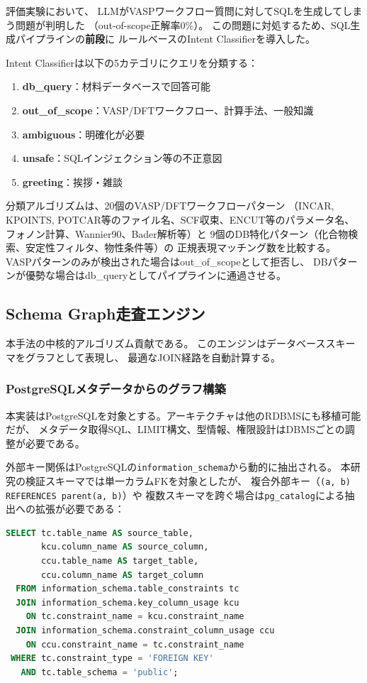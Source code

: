 \documentclass[5p,twocolumn]{elsarticle}
\begin{document}
評価実験において、
LLMがVASPワークフロー質問に対してSQLを生成してしまう問題が判明した
（out-of-scope正解率0\%）。
この問題に対処するため、SQL生成パイプラインの\textbf{前段}に
ルールベースのIntent Classifierを導入した。

Intent Classifierは以下の5カテゴリにクエリを分類する：

\begin{enumerate}
  \item \textbf{db\_query}：材料データベースで回答可能
  \item \textbf{out\_of\_scope}：VASP/DFTワークフロー、計算手法、一般知識
  \item \textbf{ambiguous}：明確化が必要
  \item \textbf{unsafe}：SQLインジェクション等の不正意図
  \item \textbf{greeting}：挨拶・雑談
\end{enumerate}

分類アルゴリズムは、20個のVASP/DFTワークフローパターン
（INCAR, KPOINTS, POTCAR等のファイル名、SCF収束、ENCUT等のパラメータ名、
フォノン計算、Wannier90、Bader解析等）と
9個のDB特化パターン（化合物検索、安定性フィルタ、物性条件等）の
正規表現マッチング数を比較する。
VASPパターンのみが検出された場合はout\_of\_scopeとして拒否し、
DBパターンが優勢な場合はdb\_queryとしてパイプラインに通過させる。

\subsection{Schema Graph走査エンジン}
\label{sec:schema_graph}

本手法の中核的アルゴリズム貢献である。
このエンジンはデータベーススキーマをグラフとして表現し、
最適なJOIN経路を自動計算する。

\subsubsection{PostgreSQLメタデータからのグラフ構築}

本実装はPostgreSQLを対象とする。アーキテクチャは他のRDBMSにも移植可能だが、
メタデータ取得SQL、LIMIT構文、型情報、権限設計はDBMSごとの調整が必要である。

外部キー関係はPostgreSQLの\texttt{information\_schema}から動的に抽出される。
本研究の検証スキーマでは単一カラムFKを対象としたが、
複合外部キー（\texttt{(a, b) REFERENCES parent(a, b)}）や
複数スキーマを跨ぐ場合は\texttt{pg\_catalog}による抽出への拡張が必要である：

\begin{lstlisting}[language=SQL,caption={FK関係抽出クエリ。},label=lst:fk_query]
SELECT tc.table_name AS source_table,
       kcu.column_name AS source_column,
       ccu.table_name AS target_table,
       ccu.column_name AS target_column
  FROM information_schema.table_constraints tc
  JOIN information_schema.key_column_usage kcu
    ON tc.constraint_name = kcu.constraint_name
  JOIN information_schema.constraint_column_usage ccu
    ON ccu.constraint_name = tc.constraint_name
 WHERE tc.constraint_type = 'FOREIGN KEY'
   AND tc.table_schema = 'public';
\end{lstlisting}
\end{document}
